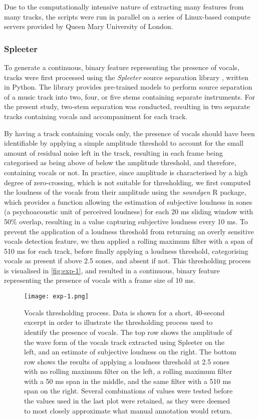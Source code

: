 Due to the computationally intensive nature of extracting many features from many tracks, the scripts were run in parallel on a series of Linux-based compute servers provided by Queen Mary University of London.

\subsubsection{Spleeter}

To generate a continuous, binary feature representing the presence of vocals, tracks were first processed using the \emph{Spleeter} source separation library \parencite{hennequin2020}, written in Python. The library provides pre-trained models to perform source separation of a music track into two, four, or five stems containing separate instruments. For the present study, two-stem separation was conducted, resulting in two separate tracks containing vocals and accompaniment for each track.

By having a track containing vocals only, the presence of vocals should have been identifiable by applying a simple amplitude threshold to account for the small amount of residual noise left in the track, resulting in each frame being categorised as being above of below the amplitude threshold, and therefore, containing vocals or not. In practice, since amplitude is characterised by a high degree of zero-crossing, which is not suitable for thresholding, we first computed the loudness of the vocals from their amplitude using the \emph{soundgen} R package, which provides a function allowing the estimation of subjective loudness in sones (a psychoacoustic unit of perceived loudness) for each 20 ms sliding window with 50\% overlap, resulting in a value capturing subjective loudness every 10 ms. To prevent the application of a loudness threshold from returning an overly sensitive vocals detection feature, we then applied a rolling maximum filter with a span of 510 ms for each track, before finally applying a loudness threshold, categorising vocals as present if above 2.5 sones, and absent if not. This thresholding process is visualised in \autoref{fig:exp-1}, and resulted in a continuous, binary feature representing the presence of vocals with a frame size of 10 ms.

\begin{figure}[t!]
\texttt{[image: exp-1.png]}
\centering
\caption{Vocals thresholding process. Data is shown for a short, 40-second excerpt in order to illustrate the thresholding process used to identify the presence of vocals. The top row shows the amplitude of the wave form of the vocals track extracted using Spleeter on the left, and an estimate of subjective loudness on the right. The bottom row shows the results of applying a loudness threshold at 2.5 sones with no rolling maximum filter on the left, a rolling maximum filter with a 50 ms span in the middle, and the same filter with a 510 ms span on the right. Several combinations of values were tested before the values used in the last plot were retained, as they were deemed to most closely approximate what manual annotation would return.}
\label{fig:exp-1}
\end{figure}

